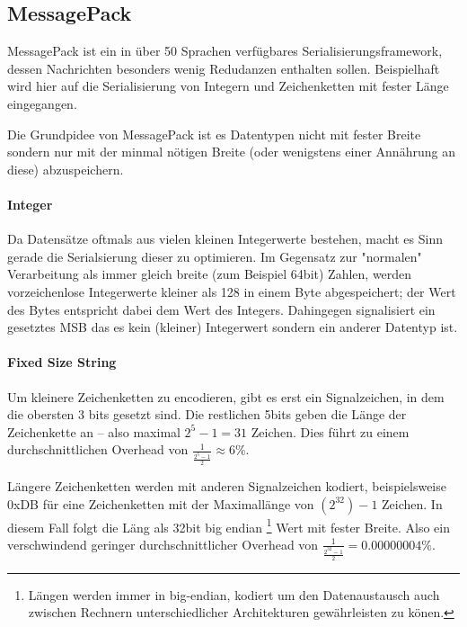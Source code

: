 \subsection{MessagePack}
MessagePack ist ein in {\"{u}}ber 50 Sprachen verf{\"{u}}gbares Serialisierungsframework, dessen Nachrichten besonders wenig Redudanzen enthalten sollen. Beispielhaft wird hier auf die Serialisierung von
Integern und Zeichenketten mit fester L{\"{a}}nge eingegangen.

Die Grundpidee von MessagePack ist es Datentypen nicht mit fester Breite sondern nur mit der minmal n{\"{o}}tigen Breite (oder wenigstens einer Ann{\"{a}}hrung an diese) abzuspeichern.
\paragraph{Integer} Da Datens{\"{a}}tze oftmals aus vielen kleinen Integerwerte bestehen, macht es Sinn gerade die Serialsierung dieser zu optimieren. Im Gegensatz zur "normalen" Verarbeitung als immer gleich breite (zum Beispiel 64bit) Zahlen, werden vorzeichenlose Integerwerte kleiner als 128 in einem Byte abgespeichert; der Wert des Bytes entspricht dabei dem Wert des Integers. Dahingegen signalisiert ein gesetztes MSB das es kein (kleiner) Integerwert sondern ein anderer Datentyp ist.
\paragraph{Fixed Size String} Um kleinere Zeichenketten zu encodieren, gibt es erst ein Signalzeichen,
in dem die obersten 3 bits gesetzt sind. Die restlichen 5bits geben die L{\"{a}}nge der Zeichenkette an --
also maximal $2^5 - 1 = 31$ Zeichen. Dies f{\"{u}}hrt zu einem durchschnittlichen Overhead von
$ \frac{1}{\frac{2^5-1}{2}} \approx 6\% $.

L{\"{a}}ngere Zeichenketten werden mit anderen Signalzeichen kodiert, beispielsweise 0xDB f{\"{u}}r eine Zeichenketten mit der Maximall{\"{a}}nge von $(2^{32})-1$ Zeichen.
In diesem Fall folgt die L{\"{a}}ng als 32bit big endian
\footnote{L{\"{a}}ngen werden immer in big-endian, kodiert um den Datenaustausch auch zwischen Rechnern unterschiedlicher Architekturen gew{\"{a}}hrleisten zu k{\"{o}}nen.}
Wert mit fester Breite. Also ein verschwindend geringer durchschnittlicher Overhead von $ \frac{1}{\frac{2^{32}-1}{2}} = 0.00000004\% $.
